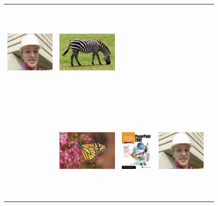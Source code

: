 \documentclass[10pt,twocolumn,letterpaper]{article}
\begin{document}
\begin{figure}[]
{\begin{tabular}{ccccc}
\includegraphics[height=5cm]{RGB4x/foreman6-A+.png}&
\includegraphics[height=5cm]{RGB4x/zebra6-A+.png}\\[4pt]
\parbox[b]{3mm}{}&
\includegraphics[height=5cm]{RGB4x/monarch10-OurIA.png}&
\includegraphics[height=5cm]{RGB4x/ppt310-OurIA.png}&
\includegraphics[height=5cm]{RGB4x/foreman10-OurIA.png}&

\end{tabular}}
\end{figure}
\end{document}
